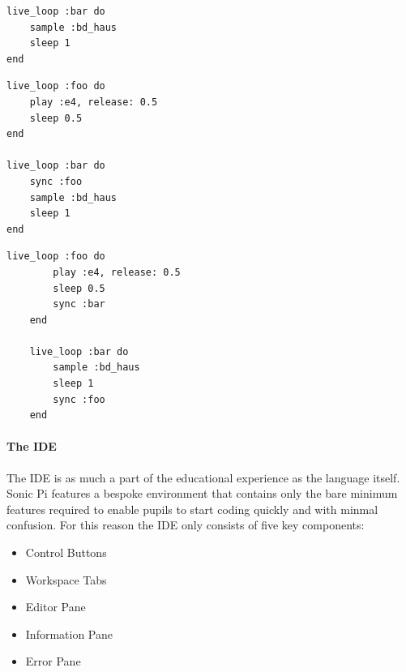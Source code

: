 \documentclass[11pt, abstracton, twoside, titlepage=true]{scrartcl}
\begin{document}
\begin{multicols}{2}
\begin{minipage}{0.5\textwidth}
\begin{minipage}{\textwidth}
\begin{lstlisting}[style = sonicpi]
live_loop :bar do
    sample :bd_haus
    sleep 1
end
			\end{lstlisting}
			 \label{outofsync}
		\end{minipage}
		\begin{minipage}{\textwidth}
			\begin{lstlisting}[style = sonicpi]
live_loop :foo do
    play :e4, release: 0.5
    sleep 0.5
end

live_loop :bar do
    sync :foo
    sample :bd_haus
    sleep 1
end
			\end{lstlisting}
			 \label{synced}
		\end{minipage}

	\end{minipage}
\end{multicols}

\begin{minipage}{\textwidth}
	\begin{lstlisting}[style = sonicpi]
	live_loop :foo do
	    play :e4, release: 0.5
	    sleep 0.5
	    sync :bar
	end

	live_loop :bar do
	    sample :bd_haus
	    sleep 1
	    sync :foo
	end
	\end{lstlisting}
\end{minipage}

\paragraph{The IDE}
The IDE is as much a part of the educational experience as the language 
itself. Sonic Pi features a bespoke environment that contains only the bare 
minimum features required to enable pupils to start coding quickly and with 
minmal confusion. For this reason the IDE only consists of five key components:

\begin{itemize}
	\item Control Buttons
	\item Workspace Tabs
	\item Editor Pane
	\item Information Pane
	\item Error Pane
\end{itemize}
\end{document}
